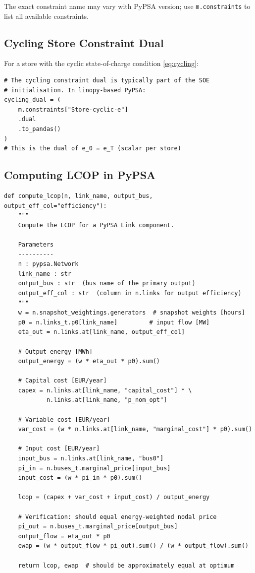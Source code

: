 \documentclass{article}
\begin{document}
The exact constraint name may vary with PyPSA version; use
\texttt{m.constraints} to list all available constraints.

\subsection{Cycling Store Constraint Dual}

For a store with the cyclic state-of-charge condition \eqref{eq:cycling}:
\begin{lstlisting}[caption={Cycling store constraint dual}]
# The cycling constraint dual is typically part of the SOE
# initialisation. In linopy-based PyPSA:
cycling_dual = (
    m.constraints["Store-cyclic-e"]
    .dual
    .to_pandas()
)
# This is the dual of e_0 = e_T (scalar per store)
\end{lstlisting}

\subsection{Computing LCOP in PyPSA}

\begin{lstlisting}[caption={Computing LCOP for a link delivering to bus b1}]
def compute_lcop(n, link_name, output_bus, output_eff_col="efficiency"):
    """
    Compute the LCOP for a PyPSA Link component.

    Parameters
    ----------
    n : pypsa.Network
    link_name : str
    output_bus : str  (bus name of the primary output)
    output_eff_col : str  (column in n.links for output efficiency)
    """
    w = n.snapshot_weightings.generators  # snapshot weights [hours]
    p0 = n.links_t.p0[link_name]         # input flow [MW]
    eta_out = n.links.at[link_name, output_eff_col]

    # Output energy [MWh]
    output_energy = (w * eta_out * p0).sum()

    # Capital cost [EUR/year]
    capex = n.links.at[link_name, "capital_cost"] * \
            n.links.at[link_name, "p_nom_opt"]

    # Variable cost [EUR/year]
    var_cost = (w * n.links.at[link_name, "marginal_cost"] * p0).sum()

    # Input cost [EUR/year]
    input_bus = n.links.at[link_name, "bus0"]
    pi_in = n.buses_t.marginal_price[input_bus]
    input_cost = (w * pi_in * p0).sum()

    lcop = (capex + var_cost + input_cost) / output_energy

    # Verification: should equal energy-weighted nodal price
    pi_out = n.buses_t.marginal_price[output_bus]
    output_flow = eta_out * p0
    ewap = (w * output_flow * pi_out).sum() / (w * output_flow).sum()

    return lcop, ewap  # should be approximately equal at optimum
\end{lstlisting}
\end{document}
